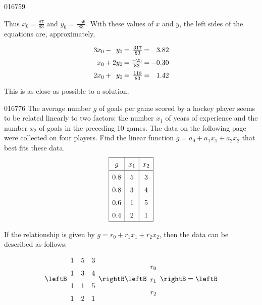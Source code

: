\begin{example}{}{016759}
\begin{solution}
Thus $x_0 = \frac{87}{83}$ and $y_0 = \frac{-56}{83}$. With these values of $x$ and $y$, the left sides of the equations are, approximately,
\begin{equation*}
\arraycolsep=1pt
\def\arraystretch{1.5}
\begin{array}{rlrcrcr}
3x_0 & - &  y_0 & = & \frac{317}{83} & = & 3.82 \\
 x_0 & + & 2y_0 & = & \frac{-25}{83} & = & -0.30 \\
2x_0 & + &  y_0 & = & \frac{118}{83} & = & 1.42
\end{array}
\end{equation*}
This is as close as possible to a solution.
\end{solution}
\end{example}

\begin{example}{}{016776}
The average number $g$ of goals per game scored by a hockey player seems to be related linearly to two factors: the number $x_{1}$ of years of experience and the number $x_{2}$ of goals in the preceding 10 games. The data on the following page were collected on four players. Find the linear function $g = a_{0} + a_{1}x_{1} + a_{2}x_{2}$ that best fits these data.
\begin{equation*}
\begin{array}{|c|c|c|}
\hline
	g & x_1 & x_2 \\ \hline
	0.8 & 5 & 3 \\
	0.8 & 3 & 4 \\
	0.6 & 1 & 5 \\
	0.4 & 2 & 1 \\ \hline
\end{array}
\end{equation*}
\begin{solution}
If the relationship is given by $g = r_{0} + r_{1}x_{1} + r_{2}x_{2}$, then the data can be described as follows:
\begin{equation*}
\leftB \begin{array}{rrr}
1 & 5 & 3 \\
1 & 3 & 4 \\
1 & 1 & 5 \\
1 & 2 & 1
\end{array} \rightB
\leftB \begin{array}{r}
r_0 \\
r_1 \\
r_2
\end{array} \rightB
= \leftB \begin{array}{r}

\end{array}
\end{equation*}
\end{solution}
\end{example}
